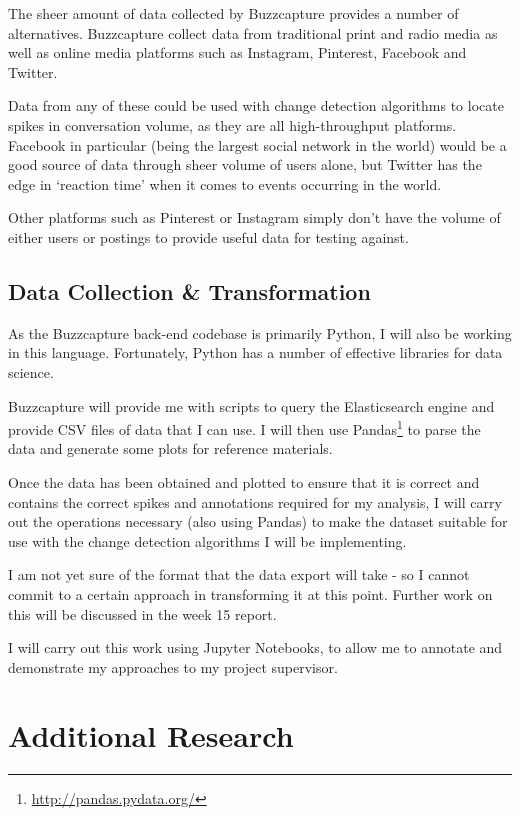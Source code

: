 \documentclass{mattreport}
\begin{document}
The sheer amount of data collected by Buzzcapture provides a number of alternatives. Buzzcapture collect data from traditional print and radio media as well as online media platforms such as Instagram, Pinterest, Facebook and Twitter.

Data from any of these could be used with change detection algorithms to locate spikes in conversation volume, as they are all high-throughput platforms. Facebook in particular (being the largest social network in the world) would be a good source of data through sheer volume of users alone, but Twitter has the edge in `reaction time' when it comes to events occurring in the world.

Other platforms such as Pinterest or Instagram simply don't have the volume of either users or postings to provide useful data for testing against.

\subsection{Data Collection \& Transformation}

As the Buzzcapture back-end codebase is primarily Python, I will also be working in this language. Fortunately, Python has a number of effective libraries for data science.

Buzzcapture will provide me with scripts to query the Elasticsearch engine and provide CSV files of data that I can use. I will then use Pandas\footnote{\url{http://pandas.pydata.org/}} to parse the data and generate some plots for reference materials.

Once the data has been obtained and plotted to ensure that it is correct and contains the correct spikes and annotations required for my analysis, I will carry out the operations necessary (also using Pandas) to make the dataset suitable for use with the change detection algorithms I will be implementing.

I am not yet sure of the format that the data export will take - so I cannot commit to a certain approach in transforming it at this point. Further work on this will be discussed in the week 15 report.

I will carry out this work using Jupyter Notebooks, to allow me to annotate and demonstrate my approaches to my project supervisor.

\section{Additional Research}
\end{document}
